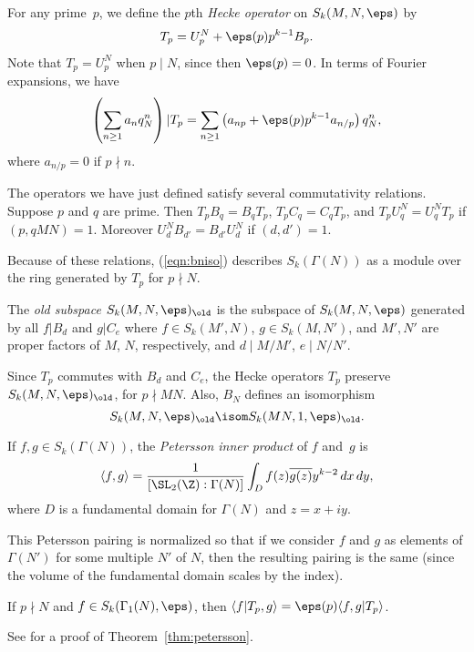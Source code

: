 \documentclass{report}
\begin{document}
For any prime~$p$, we define the $p$th {\em Hecke operator}
on $S_k(M,N,\eps)$ by
\[
   T_p = U_p^N + \eps(p) p^{k-1} B_p.
\]
Note that $T_p=U_p^N$ when $p\mid N$, since then $\eps(p)=0$.
In terms of Fourier expansions, we have
\[
   \left(\sum_{n \geq 1} a_n q_N^n\right)|T_p = \sum_{n\geq 1} \left(
    a_{np} + \eps(p) p^{k-1} a_{n/p}\right) q_N^n,
\]
where $a_{n/p}=0$ if $p\nmid n$.

The operators we have just defined satisfy several commutativity relations.
Suppose $p$ and $q$ are prime. Then $T_p B_q = B_q T_p$, $T_p C_q
= C_q T_p$, and $T_p U_q^N = U_q^N T_p$ if $(p,qMN)=1$.  Moreover
$U_d^N B_{d'} = B_{d'} U_d^N$ if $(d,d')=1$.

\begin{remark}
  Because of these relations, (\ref{eqn:bniso}) describes
  $S_k(\Gamma(N))$ as a module over the ring generated by $T_p$ for
  $p\nmid N$.
\end{remark}


\begin{definition}
The {\em old subspace} $S_k(M,N,\eps)_{\old}$ is the subspace of
$S_k(M,N,\eps)$ generated by all $f|B_d$ and $g|C_{e}$ where $f\in
S_k(M',N)$, $g\in S_k(M,N')$, and $M', N'$ are proper factors of
$M$, $N$, respectively, and $d\mid M/M'$, $e\mid N/N'$.
\end{definition}

Since $T_p$ commutes with $B_d$ and $C_e$, the Hecke operators
$T_p$ preserve $S_k(M,N,\eps)_{\old}$, for $p\nmid MN$.
Also, $B_N$ defines an isomorphism
\[
  S_k(M,N,\eps)_{\old} \isom S_k(MN,1,\eps)_{\old}.
\]

\begin{definition}
If $f, g\in S_k(\Gamma(N))$, the {\em Petersson inner product} of
$f$ and~$g$ is
\[
   \langle f, g\rangle =
      \frac{1}{[\SL_2(\Z) : \Gamma(N)]} \int_{D}
         f(z)\overline{g(z)} y^{k-2}\, dx\, dy,
\]
where $D$ is a fundamental domain for $\Gamma(N)$ and $z=x+ i y$.
\end{definition}
This Petersson pairing is normalized so that if we consider $f$ and $g$ as
elements of $\Gamma(N')$ for some multiple $N'$ of $N$, then the
resulting pairing is the same (since the volume of the fundamental domain
scales by the index).

\begin{theorem}[Petersson]\label{thm:petersson}
If $p\nmid N$ and $f\in S_k(\Gamma_1(N),\eps)$, then $\langle
f|T_p, g \rangle = \eps(p)\langle f, g|T_p\rangle$.
\end{theorem}
See \cite[\S{}VII.5, Thm.~5.1]{lang:modular} for a proof of Theorem~\ref{thm:petersson}.
\end{document}

